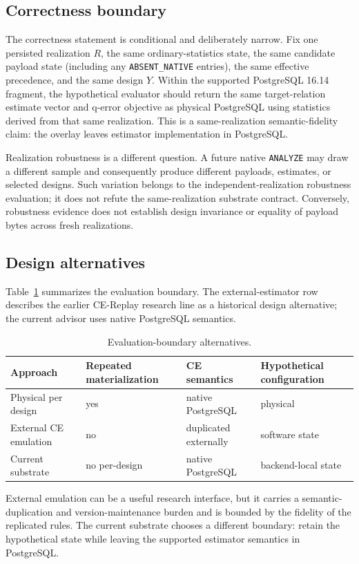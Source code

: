 \subsection{Correctness boundary}

The correctness statement is conditional and deliberately narrow.  Fix one
persisted realization $R$, the same ordinary-statistics state, the same
candidate payload state (including any \texttt{ABSENT\_NATIVE} entries), the
same effective precedence, and the same design $Y$.  Within the supported
PostgreSQL 16.14 fragment, the hypothetical evaluator should return the same
target-relation estimate vector and q-error objective as physical PostgreSQL
using statistics derived from that same realization.  This is a
same-realization semantic-fidelity claim: the overlay leaves estimator
implementation in PostgreSQL.

Realization robustness is a different question.  A future native
\texttt{ANALYZE} may draw a different sample and consequently produce
different payloads, estimates, or selected designs.  Such variation belongs
to the independent-realization robustness evaluation; it does not refute the
same-realization substrate contract.  Conversely, robustness evidence does
not establish design invariance or equality of payload bytes across fresh
realizations.

\subsection{Design alternatives}

Table~\ref{tab:eval-alternatives} summarizes the evaluation boundary.  The
external-estimator row describes the earlier CE-Replay research line as a
historical design alternative; the current advisor uses native PostgreSQL
semantics.

\begin{table}[t]
\caption{Evaluation-boundary alternatives.}
\label{tab:eval-alternatives}
\centering
\small
\begin{tabular}{p{}p{}p{}p{}}
\toprule
Approach & Repeated materialization & CE semantics & Hypothetical configuration \\
\midrule
Physical per design & yes & native PostgreSQL & physical \\
External CE emulation & no & duplicated externally & software state \\
Current substrate & no per-design & native PostgreSQL & backend-local state \\
\bottomrule
\end{tabular}
\end{table}

External emulation can be a useful research interface, but it carries a
semantic-duplication and version-maintenance burden and is bounded by the
fidelity of the replicated rules.  The current substrate chooses a different
boundary: retain the hypothetical state while leaving the supported estimator
semantics in PostgreSQL.
